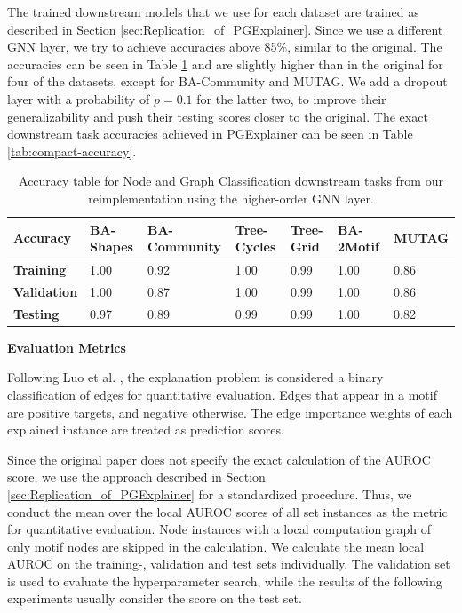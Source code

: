The trained downstream models that we use for each dataset are trained as described in Section \ref{sec:Replication_of_PGExplainer}. Since we use a different GNN layer, we try to achieve accuracies above 85\%, similar to the original. The accuracies can be seen in Table \ref{tab:our-dt-accuracy} and are slightly higher than in the original for four of the datasets, except for BA-Community and MUTAG. We add a dropout layer with a probability of $p=0.1$ for the latter two, to improve their generalizability and push their testing scores closer to the original. The exact downstream task accuracies achieved in PGExplainer can be seen in Table \ref{tab:compact-accuracy}. \bigskip

\begin{table}[h]
    \centering
    \scriptsize
    \begin{tabularx}{\linewidth}{l|X X X X|X X}
    \hline
    \textbf{Accuracy} & \textbf{BA-Shapes} & \textbf{BA-Community} & \textbf{Tree-Cycles} & \textbf{Tree-Grid} & \textbf{BA-2Motif} & \textbf{MUTAG} \\
    \hline
    \textbf{Training}   & 1.00 & 0.92 & 1.00 & 0.99 & 1.00 & 0.86 \\
    \textbf{Validation} & 1.00 & 0.87 & 1.00 & 0.99 & 1.00 & 0.86 \\
    \textbf{Testing}    & 0.97 & 0.89 & 0.99 & 0.99 & 1.00 & 0.82 \\
    \hline
    \end{tabularx}
    \caption[Accuracies of higher-order GNN downstream task]{Accuracy table for Node and Graph Classification downstream tasks from our reimplementation using the higher-order GNN layer.}
    \label{tab:our-dt-accuracy}
\end{table}

\textbf{Evaluation Metrics}\par
Following Luo et al. \cite{luo2020parameterized}, the explanation problem is considered a binary classification of edges for quantitative evaluation. Edges that appear in a motif are positive targets, and negative otherwise. The edge importance weights of each explained instance are treated as prediction scores.

Since the original paper does not specify the exact calculation of the AUROC score, we use the approach described in Section \ref{sec:Replication_of_PGExplainer} for a standardized procedure. Thus, we conduct the mean over the local AUROC scores of all set instances as the metric for quantitative evaluation. Node instances with a local computation graph of only motif nodes are skipped in the calculation. We calculate the mean local AUROC on the training-, validation and test sets individually. The validation set is used to evaluate the hyperparameter search, while the results of the following experiments usually consider the score on the test set.

